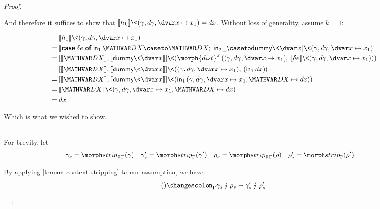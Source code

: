\begin{proof}
\begin{description}[topsep=\baselineskip,itemsep=\baselineskip]
    \noindent
    And therefore it suffices to show that $\den{h_k} \<(\gamma, \dgamma, \dvar x \mapsto x_1) = dx$. Without loss of generality, assume $k = 1$:

    \nopagebreak[2]
    \begin{align*}
      &\phantom{{}={}}
      \den{h_1} \<(\gamma, \dgamma, \dvar x \mapsto x_1)
      \\
      &= \den{\emcase{\delta e}
      \inj 1 \mvar\dx \caseto \mvar\dx;\;
      \inj 2 \pwild \caseto \dummy\<\dvar x}
      \<(\gamma, \dgamma, \dvar x \mapsto x_1)
      \\
      &= \krof{\den{\mvar\dx}, \den{\dummy\<\dvar x}}
      \<(\morph{dist}^x_+
      ((\gamma, \dgamma, \dvar x \mapsto x_1),\,
      \den{\delta e}\<(\gamma, \dgamma, \dvar x \mapsto x_1)))
      \\
      &= \krof{\den{\mvar\dx}, \den{\dummy\<\dvar x}}
      \<((\gamma, \dgamma, \dvar x \mapsto x_1),\, (\inj 1 dx))
      \\
      &= \krof{\den{\mvar\dx}, \den{\dummy\<\dvar x}}
      \<(\inj 1 (\gamma, \dgamma, \dvar x \mapsto x_1, \mvar\dx \mapsto dx))
      \\
      &= \den{\mvar\dx}
      \<(\gamma, \dgamma, \dvar x \mapsto x_1, \mvar\dx \mapsto dx)
      \\
      &= dx
    \end{align*}

    Which is what we wished to show.

  \item[Case $\infer{
      \J e {\stripcx{\Gamma}} A
    }{
      \J{\ebox{e}}{\Gamma}{\iso A}
    }$,\, 
    $\phi \ebox e = \ebox{\etuple{\phi e, \delta e}}$,\, 
    $\delta \ebox e = \etuple{}$.
  ]~\\

    \noindent
    For brevity, let
    \begin{align*}
       \gamma_s &= \morphstrip_{\Phi\Gamma}(\gamma) &
       \gamma_s' &= \morphstrip_\Gamma(\gamma') &
       \rho_s &= \morphstrip_{\Phi\Gamma}(\rho) &
       \rho_s' &= \morphstrip_\Gamma(\rho')
    \end{align*}

    By applying \cref{lemma-context-stripping} to our assumption, we have
%
    \begin{equation}\label{equation-strip-valid}
    \weirdat{\Gamma}{()}{\gamma_s}{\rho_s}{\gamma_s'}{\rho_s'}
    \end{equation}


\end{description}
\end{proof}
